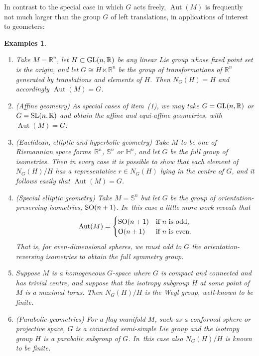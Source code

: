 \documentclass[10pt,a4paper]{amsart}
\numberwithin{equation}{section}
\newtheorem{Examples}[Theorem]{Examples}
\DeclareMathOperator{\automorphism}{Aut}
\begin{document}
In contrast to the special case in which $G$ acts freely,
$\automorphism(M)$ is frequently not much larger than the group $G$ of
left translations, in applications of interest to geometers:
\begin{Examples}%
\mbox{}
\begin{enumerate}\itemsep=0pt
\item %
Take $M={\mathbb R}^n$, let $H \subset
{\rm GL}(n,{\mathbb R})$ be any linear Lie group whose fixed point
set is the origin, and let $G \cong H \ltimes {\mathbb R}^n $ be the
group of transformations of ${\mathbb R}^n $ generated by translations
and elements of $H$. Then $N_G(H)=H$ and accordingly
$\automorphism(M)=G$.

\item ({\it Affine geometry}) As special cases of item~(1), we may take
$G={\rm GL}(n,{\mathbb R})$ or $G={\rm SL}(n,{\mathbb R})$ and
obtain the affine and equi-affine geometries, with
$\automorphism(M)=G$.

\item %
({\it Euclidean, elliptic and hyperbolic geometry}) Take
$M$ to be one of Riemannian space forms~${\mathbb R}^n$, ${\mathbb S}^n$ or
${\mathbb H}^n $, and let $G$ be the full group of isometries. Then in
every case it is possible to show that each element of $N_G(H)/H$ has
a representative $r \in N_G(H) $ lying in the centre of $G$, and it
follows easily that $\automorphism(M)=G$.

\item ({\it Special elliptic geometry}) Take $M = {\mathbb S}^n$ but let $G$ be the
group of {\em orientation-preserving} isometries,
${\rm SO}(n+1)$. In~this case a little more work reveals that
 \begin{equation*}
 \automorphism(M)=
 \begin{cases}
{\rm SO}(n+1)&\text{if $n$ is odd},\\
{\rm O}(n+1)&\text{if $n $ is even}.
 \end{cases}
 \end{equation*}
 That is, for even-dimensional spheres, we must add
to $G$ the orientation-reversing isometries to obtain the full
symmetry group.

\item %
Suppose $M$ is a homogeneous $G$-space where $G$ is
compact and connected and has trivial centre, and suppose that the
isotropy subgroup $H$ at some point of $M$ is a maximal torus. Then
$N_G(H)/H$ is the Weyl group, well-known to be {\em finite}.

\item ({\it Parabolic geometries}) For a flag manifold $M$, such as a
conformal sphere or projective space, $G$ is a connected semi-simple
Lie group and the isotropy group $H$ is a parabolic subgroup of
$G$. In~this case also $N_G(H)/H$ is known to be finite.
\end{enumerate}
\end{Examples}
\end{document}
